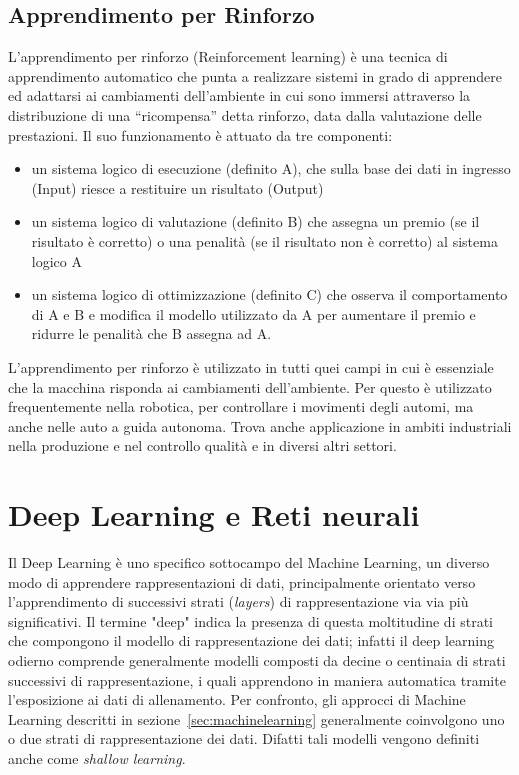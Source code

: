 \subsection{Apprendimento per Rinforzo}
L'apprendimento per rinforzo (Reinforcement learning) è una tecnica di apprendimento automatico che punta a realizzare sistemi in grado di apprendere ed adattarsi ai cambiamenti dell'ambiente in cui sono immersi attraverso la distribuzione di una “ricompensa” detta rinforzo, data dalla valutazione delle prestazioni.
Il suo funzionamento è attuato da tre componenti:
\begin{itemize}
\item un sistema logico di esecuzione (definito A), che sulla base dei dati in ingresso (Input) riesce a restituire un risultato (Output)
\item un sistema logico di valutazione (definito B) che assegna un premio (se il risultato è corretto) o una penalità (se il risultato non è corretto) al sistema logico A
\item un sistema logico di ottimizzazione (definito C) che osserva il comportamento di A e B e modifica il modello utilizzato da A per aumentare il premio e ridurre le penalità che B assegna ad A.
\end{itemize}

L'apprendimento per rinforzo è utilizzato in tutti quei campi in cui è essenziale che la macchina risponda ai cambiamenti dell'ambiente. Per questo è utilizzato frequentemente nella robotica, per controllare i movimenti degli automi, ma anche nelle auto a guida autonoma. Trova anche applicazione in ambiti industriali nella produzione e nel controllo qualità e in diversi altri settori.



\newpage
\section{Deep Learning e Reti neurali}
\label{sec:deeplearning}
Il Deep Learning è uno specifico sottocampo del Machine Learning, un diverso modo di apprendere rappresentazioni di dati, principalmente orientato verso l'apprendimento di successivi strati (\textit{layers}) di rappresentazione via via più significativi. Il termine "deep" indica la presenza di questa moltitudine di strati che compongono il modello
di rappresentazione dei dati; infatti il deep learning odierno comprende generalmente modelli composti da decine o centinaia di strati successivi di rappresentazione, i quali apprendono in maniera automatica tramite l'esposizione ai dati di allenamento. Per confronto, gli approcci di Machine Learning descritti in sezione~\ref{sec:machinelearning} generalmente coinvolgono uno o due strati di rappresentazione dei dati. Difatti tali modelli vengono definiti anche come \textit{shallow learning}.
 
